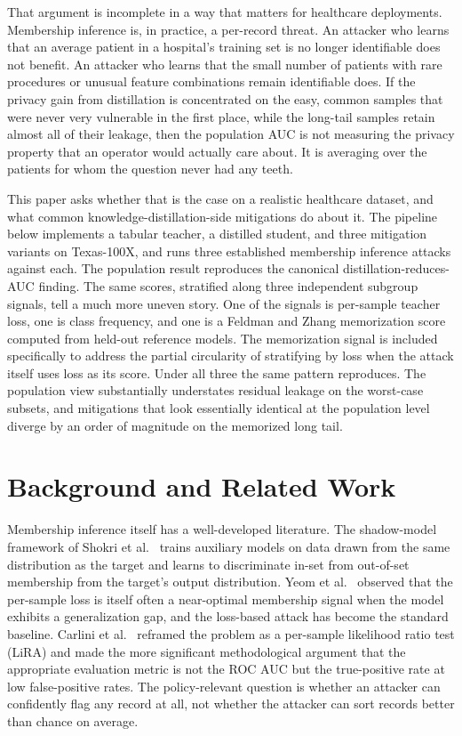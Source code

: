 \documentclass[conference]{IEEEtran}
\begin{document}
That argument is incomplete in a way that matters for healthcare deployments. Membership inference is, in practice, a per-record threat. An attacker who learns that an average patient in a hospital's training set is no longer identifiable does not benefit. An attacker who learns that the small number of patients with rare procedures or unusual feature combinations remain identifiable does. If the privacy gain from distillation is concentrated on the easy, common samples that were never very vulnerable in the first place, while the long-tail samples retain almost all of their leakage, then the population AUC is not measuring the privacy property that an operator would actually care about. It is averaging over the patients for whom the question never had any teeth.

This paper asks whether that is the case on a realistic healthcare dataset, and what common knowledge-distillation-side mitigations do about it. The pipeline below implements a tabular teacher, a distilled student, and three mitigation variants on Texas-100X, and runs three established membership inference attacks against each. The population result reproduces the canonical distillation-reduces-AUC finding. The same scores, stratified along three independent subgroup signals, tell a much more uneven story. One of the signals is per-sample teacher loss, one is class frequency, and one is a Feldman and Zhang memorization score computed from held-out reference models. The memorization signal is included specifically to address the partial circularity of stratifying by loss when the attack itself uses loss as its score. Under all three the same pattern reproduces. The population view substantially understates residual leakage on the worst-case subsets, and mitigations that look essentially identical at the population level diverge by an order of magnitude on the memorized long tail.

\section*{Background and Related Work}

Membership inference itself has a well-developed literature. The shadow-model framework of Shokri et al.~\cite{shokri2017} trains auxiliary models on data drawn from the same distribution as the target and learns to discriminate in-set from out-of-set membership from the target's output distribution. Yeom et al.~\cite{yeom2018} observed that the per-sample loss is itself often a near-optimal membership signal when the model exhibits a generalization gap, and the loss-based attack has become the standard baseline. Carlini et al.~\cite{carlini2022} reframed the problem as a per-sample likelihood ratio test (LiRA) and made the more significant methodological argument that the appropriate evaluation metric is not the ROC AUC but the true-positive rate at low false-positive rates. The policy-relevant question is whether an attacker can confidently flag any record at all, not whether the attacker can sort records better than chance on average.
\end{document}
